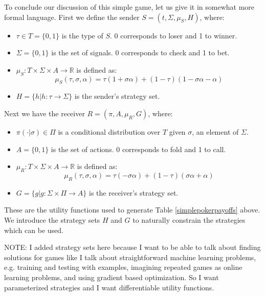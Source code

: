 \documentclass{article}
\begin{document}
To conclude our discussion of this simple game, let us give it in somewhat more formal language. First we define the sender $S = (t, \Sigma, \mu_S, H)$, where:
\begin{itemize}
	\item $\tau \in T = \lbrace 0, 1 \rbrace$ is the type of $S$. 0 corresponds to loser and 1 to winner.
	\item $\Sigma = \lbrace 0, 1 \rbrace$ is the set of signals. 0 corresponds to check and 1 to bet.
	\item $\mu_S: T \times \Sigma \times A \longrightarrow \mathbb{R}$ is defined as:
		\begin{equation}
\mu_S(\tau, \sigma, \alpha) = \tau(1+\sigma\alpha) + (1-\tau)(1-\sigma\alpha-\alpha)
		\end{equation}
	\item $H = \lbrace h | h: \tau \rightarrow \Sigma \rbrace$ is the sender's strategy set.
\end{itemize}

\noindent Next we have the receiver $R = (\pi, A, \mu_R, G)$, where:
\begin{itemize}
	\item $\pi(\cdot|\sigma) \in \Pi$ is a conditional distribution over $T$ given $\sigma$, an element of $\Sigma$.
	\item $A = \lbrace 0, 1 \rbrace$ is the set of actions. 0 corresponds to fold and 1 to call.
	\item $\mu_R: T \times \Sigma \times A \longrightarrow \mathbb{R}$ is defined as:
		\begin{equation}
\mu_R(\tau, \sigma, \alpha) = \tau(-\sigma\alpha) + (1-\tau)(\sigma\alpha+\alpha)
		\end{equation}
	\item $G = \lbrace g | g: \Sigma \times \Pi \rightarrow A \rbrace$ is the receiver's strategy set.
\end{itemize}

\noindent These are the utility functions used to generate Table \ref{simplepokerpayoffs} above. We introduce the strategy sets $H$ and $G$ to naturally constrain the strategies which can be used.

NOTE: I added strategy sets here because I want to be able to talk about finding solutions for games like I talk about straightforward machine learning problems, e.g. training and testing with examples, imagining repeated games as online learning problems, and using gradient based optimization. So I want parameterized strategies and I want differentiable utility functions.
\end{document}
